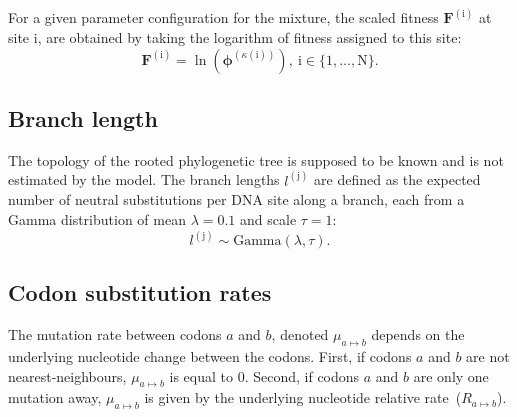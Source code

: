 \documentclass{article}
\newcommand{\UniDimArray}[1]{\bm{#1}}
\newcommand{\fit}{F}
\newcommand{\Fit}{\UniDimArray{\fit}}
\newcommand{\ci}{{a}}
\newcommand{\cj}{{b}}
\newcommand{\itoj}{\ci \mapsto \cj}
\newcommand{\mutmatrix}{R}
\newcommand{\branch}{\text{j}}
\newcommand{\branchexp}{^{(\branch)}}
\newcommand{\branchlength}{l}
\newcommand{\site}{\text{i}}
\newcommand{\Nsite}{\text{N}}
\newcommand{\siteexp}{^{(\site)}}
\newcommand{\Setsite}{\site \in \{1, \hdots, \Nsite\} }
\newcommand{\profile}{\phi}
\newcommand{\Profile}{\UniDimArray{\profile}}
\newcommand{\catVar}{\kappa}
\newcommand{\catsite}{\catVar\left(\site\right)}
\begin{document}
    For a given parameter configuration for the mixture, the scaled fitness $\Fit\siteexp$ at site $\site$, are obtained by taking the logarithm of fitness assigned to this site:
    \begin{equation}
        \label{eq:sitefitness}
        \Fit\siteexp = \ln \left( \Profile^{\left( \catsite \right)} \right),\ \Setsite.
    \end{equation}

    \subsection{Branch length}
    The topology of the rooted phylogenetic tree is supposed to be known and is not estimated by the model.
    The branch lengths $\branchlength\branchexp$ are defined as the expected number of {neutral} substitutions per {DNA} site along a branch, each from a Gamma distribution of mean $\lambda=0.1$ and scale $\tau=1$:
    \begin{equation}
        \label{eq:branchlength}
        \branchlength\branchexp \sim \text{Gamma}\left( \lambda, \tau \right).
    \end{equation}

    \subsection{Codon substitution rates}
    \label{sec:codon}
    The mutation rate between codons $\ci$ and $\cj$, denoted $\mu_{\itoj}$ depends on the underlying nucleotide change between the codons.
    First, if codons $\ci$ and $\cj$ are not nearest-neighbours, $\mu_{\itoj}$ is equal to $0$.
    Second, if codons $\ci$ and $\cj$ are only one mutation away, $\mu_{\itoj}$ is given by the underlying nucleotide relative rate~(${\mutmatrix_{\itoj}}$).
\end{document}
